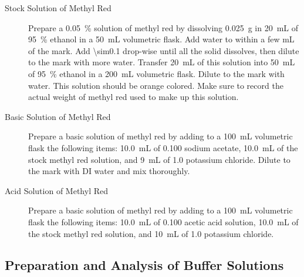 \begin{description}
	\item[Stock Solution of Methyl Red] 
	Prepare a \qty{0.05}{\percent} solution of methyl red by dissolving \qty{0.025}{\gram} in \qty{20}{\mL} of \qty{95}{\percent} ethanol in a \qty{50}{\mL} volumetric flask. 
	Add water to within a few \unit{\mL} of the mark. 
	Add \qty{\sim0.1}{\Molar}  drop-wise until all the solid dissolves, then dilute to the mark with more water. 
	Transfer \qty{20}{\mL} of this solution into \qty{50}{\mL} of \qty{95}{\percent} ethanol in a \qty{200}{\mL} volumetric flask. 
	Dilute to the mark with water. 
	This solution should be orange colored. 
	Make sure to record the actual weight of methyl red used to make up this solution. 
	\item[Basic Solution of Methyl Red] 
	Prepare a basic solution of methyl red by adding to a \qty{100}{\mL} volumetric flask the following items: \qty{10.0}{\mL} of \qty{0.100}{\Molar} sodium acetate, \qty{10.0}{\mL} of the stock methyl red solution, and \qty{9}{\mL} of \qty{1.0}{\Molar} potassium chloride.
	Dilute to the mark with DI water and mix thoroughly. 
	\item[Acid Solution of Methyl Red]
	Prepare a basic solution of methyl red by adding to a \qty{100}{\mL} volumetric flask the following items: \qty{10.0}{\mL} of \qty{0.100}{\Molar} acetic acid solution, \qty{10.0}{\mL} of the stock methyl red solution, and \qty{10}{\mL} of \qty{1.0}{\Molar} potassium chloride.
\end{description}

\subsection{Preparation and Analysis of Buffer Solutions}
\label{subs:preparation_and_analysis_of_buffer_solutions}

